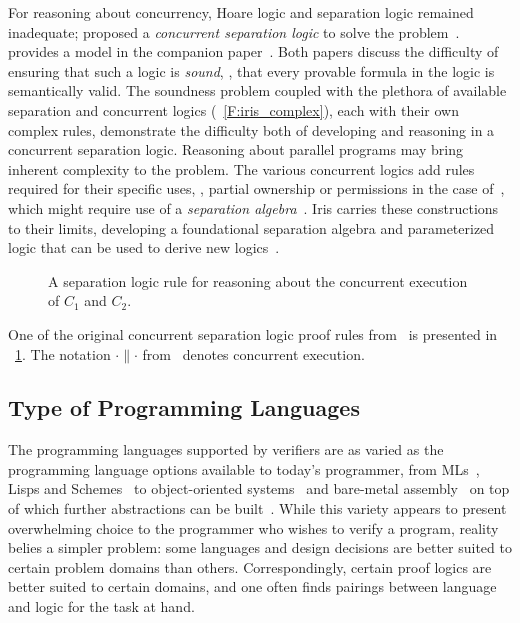 For reasoning about concurrency, Hoare logic and separation logic remained
inadequate; \citeauthor{O_Hearn_2007} proposed a \emph{concurrent separation
logic} to solve the problem~\cite{O_Hearn_2007}. \citeauthor{Brookes_2007}
provides a model in the companion paper~\cite{Brookes_2007}. Both papers discuss
the difficulty of ensuring that such a logic is \emph{sound}, \ie, that every
provable formula in the logic is semantically valid. The soundness problem
coupled with the plethora of available separation and concurrent logics
(\figurename~\ref{F:iris_complex}), each with their own complex rules,
demonstrate the difficulty both of developing and reasoning in a concurrent
separation logic. Reasoning about parallel programs may bring inherent
complexity to the problem. The various concurrent logics add rules required for
their specific uses, \eg, partial ownership or permissions in the case
of~\cite{Appel_2011}, which might require use of a \emph{separation
algebra}~\cite{Jung_2016,Krebbers_2017a}. Iris carries these constructions to
their limits, developing a foundational separation algebra and parameterized
logic that can be used to derive new logics~\cite{Jung_2018b}.

\begin{figure}[ht]
    \centering
    \caption{A separation logic rule for reasoning about the concurrent
    execution of \(C_1\) and \(C_2\).}\label{F:CSL_ex}
\end{figure}

One of the original concurrent separation logic proof rules
from~\cite{O_Hearn_2007} is presented in \figurename~\ref{F:CSL_ex}. The
notation \(\cdot \parallel \cdot\) from~\cite{O_Hearn_2007} denotes concurrent
execution.

\subsection{Type of Programming Languages}\label{S:t_pl}

The programming languages supported by verifiers are as varied as the
programming language options available to today's programmer, from
MLs~\cite{Coq,Kumar_2014}, Lisps and Schemes~\cite{Torlak_2013} to
object-oriented systems~\cite{leino2008specification,leino2010dafny} and
bare-metal assembly~\cite{Chlipala_2011} on top of which further abstractions
can be built~\cite{Chlipala_2015}. While this variety appears to present
overwhelming choice to the programmer who wishes to verify a program, reality
belies a simpler problem: some languages and design decisions are better suited
to certain problem domains than others. Correspondingly, certain proof logics
are better suited to certain domains, and one often finds pairings between
language and logic for the task at hand.

